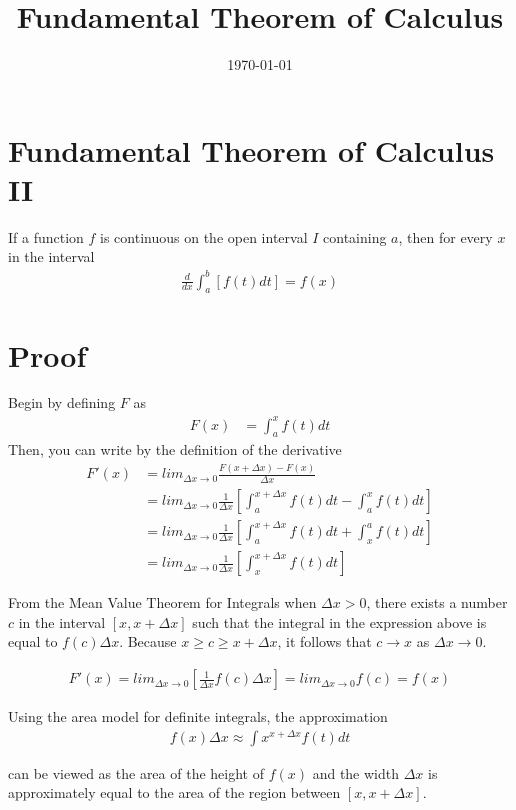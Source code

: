 \documentclass[a4paper, 12pt]{article}
\begin{document}
\title{Fundamental Theorem of Calculus}
\date{\today}
\pagestyle{empty} 
\section{Fundamental Theorem of Calculus II}
	If a function $f$ is continuous on the open interval $I$ containing $a$, then for every $x$ in the interval
\begin{align}
	\frac{d}{dx} \int_a^b [f(t) dt] = f(x)
\end{align}
\section{Proof}
	Begin by defining $F$ as
\begin{align}
	F(x) &= \int_a^x f(t) dt
\end{align}
	Then, you can write by the definition of the derivative
\begin{align*}
	F'(x) &= lim_{\Delta x \to 0} \frac{F(x + \Delta x) - F(x)}{\Delta x} \\
		  &= lim_{\Delta x \to 0} \frac{1}{\Delta x} [\int_{a}^{x + \Delta x} f(t) dt - \int_a^x f(t) dt ] \\
		  &=  lim_{\Delta x \to 0} \frac{1}{\Delta x} [\int_{a}^{x + \Delta x} f(t) dt + \int_x^a f(t) dt ] \\
		  &=  lim_{\Delta x \to 0} \frac{1}{\Delta x} [\int_{x}^{x + \Delta x} f(t) dt]
\end{align*}

	From the Mean Value Theorem for Integrals when $\Delta x > 0$, there exists a number $c$ in the interval $[x, x + \Delta x]$ such that the integral in the expression above is equal to $f(c) \Delta x$.  Because $x \geq c \geq x + \Delta x$, it follows that $c \to x$ as $\Delta x \to 0$.
	
\begin{align*}
	F'(x) = lim_{\Delta x \to 0} [\frac{1}{\Delta x} f(c) \Delta x ] = lim_{\Delta x \to 0} f(c) = f(x)
\end{align*}

	Using the area model for definite integrals, the approximation
\begin{align}
	f(x) \Delta x \approx \int{x}^{x + \Delta x} f(t) dt
\end{align}	

	can be viewed as the area of the height of $f(x)$ and the width $\Delta x$ is approximately equal to the area of the region between $[x, x + \Delta x]$.
\end{document}

